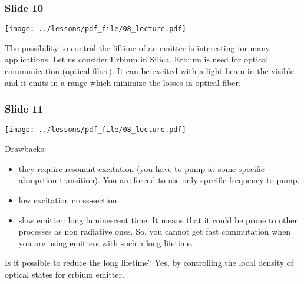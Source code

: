\documentclass[../main/main.tex]{subfiles}
\begin{document}
\subsubsection*{Slide 10}

\begin{minipage}[]{0.5\linewidth}
\centering
\texttt{[image: ../lessons/pdf\_file/08\_lecture.pdf]}
\end{minipage}
\hspace{0.3cm}
\vspace{0.3cm}
\begin{minipage}[c]{0.47\linewidth}

The possibility to control the liftime of an emitter is interesting for many applications. Let us consider Erbium in Silica. Erbium is used for optical communication (optical fiber). It can be excited with a light beam in the visible and it emits in a range which minimize the losses in optical fiber.

\end{minipage}

\subsubsection*{Slide 11}

\begin{minipage}[]{0.5\linewidth}
\centering
\texttt{[image: ../lessons/pdf\_file/08\_lecture.pdf]}
\end{minipage}
\hspace{0.3cm}
\vspace{0.3cm}
\begin{minipage}[c]{0.47\linewidth}

    Drawbacks:

    \begin{itemize}
    \item they require resonant excitation (you have to pump at some specific absoprtion transition). You are forced to use only specific frequency to pump.

    \item low excitation cross-section.

    \item slow emitter: long luminescent time. It means that it could be prone to other processes as non radiative ones. So, you cannot get fast commutation when you are using emitters with such a long lifetime.

    \end{itemize}

Is it possible to reduce the long lifetime? Yes, by controlling the local density of optical states for erbium emitter.

\end{minipage}
\end{document}
